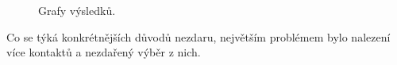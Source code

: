 \newsavebox{\tempbox}
\begin{figure}[H]
    \qquad
    \caption{Grafy výsledků.}
\end{figure}

Co se týká konkrétnějších důvodů nezdaru, největším problémem bylo nalezení více
kontaktů a nezdařený výběr z nich.
